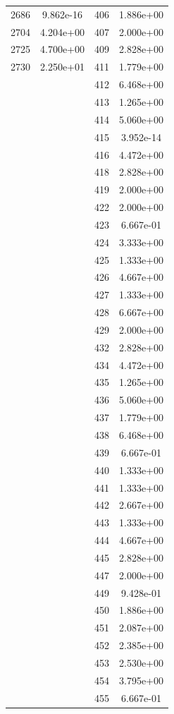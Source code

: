 \documentclass[12pt]{article}
\begin{document}
\begin{longtable}{@{}cccc@{}}
2686 & 9.862e-16 & 406 & 1.886e+00 \\
2704 & 4.204e+00 & 407 & 2.000e+00 \\
2725 & 4.700e+00 & 409 & 2.828e+00 \\
2730 & 2.250e+01 & 411 & 1.779e+00 \\
 &  & 412 & 6.468e+00 \\
 &  & 413 & 1.265e+00 \\
 &  & 414 & 5.060e+00 \\
 &  & 415 & 3.952e-14 \\
 &  & 416 & 4.472e+00 \\
 &  & 418 & 2.828e+00 \\
 &  & 419 & 2.000e+00 \\
 &  & 422 & 2.000e+00 \\
 &  & 423 & 6.667e-01 \\
 &  & 424 & 3.333e+00 \\
 &  & 425 & 1.333e+00 \\
 &  & 426 & 4.667e+00 \\
 &  & 427 & 1.333e+00 \\
 &  & 428 & 6.667e+00 \\
 &  & 429 & 2.000e+00 \\
 &  & 432 & 2.828e+00 \\
 &  & 434 & 4.472e+00 \\
 &  & 435 & 1.265e+00 \\
 &  & 436 & 5.060e+00 \\
 &  & 437 & 1.779e+00 \\
 &  & 438 & 6.468e+00 \\
 &  & 439 & 6.667e-01 \\
 &  & 440 & 1.333e+00 \\
 &  & 441 & 1.333e+00 \\
 &  & 442 & 2.667e+00 \\
 &  & 443 & 1.333e+00 \\
 &  & 444 & 4.667e+00 \\
 &  & 445 & 2.828e+00 \\
 &  & 447 & 2.000e+00 \\
 &  & 449 & 9.428e-01 \\
 &  & 450 & 1.886e+00 \\
 &  & 451 & 2.087e+00 \\
 &  & 452 & 2.385e+00 \\
 &  & 453 & 2.530e+00 \\
 &  & 454 & 3.795e+00 \\
 &  & 455 & 6.667e-01 \\

\end{longtable}
\end{document}
